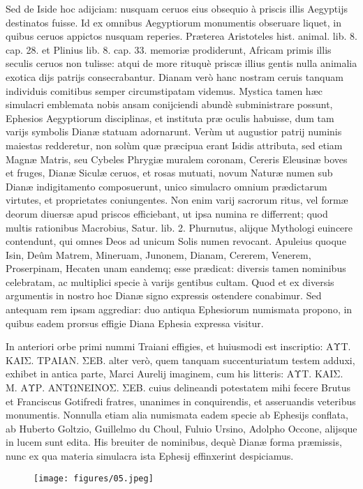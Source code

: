\documentclass[a4paper, 11pt, oneside, polutonikogreek, latin]{article}
\begin{document}
Sed de Iside hoc adijciam: nusquam ceruos eius obsequio à priscis illis Aegyptijs destinatos fuisse. Id ex omnibus Aegyptiorum monumentis obseruare liquet, in quibus ceruos appictos nusquam reperies. Præterea Aristoteles hist. animal. lib. 8. cap. 28. et Plinius lib. 8. cap. 33. memoriæ prodiderunt, Africam primis illis seculis ceruos non tulisse: atqui de more rituquè priscæ illius gentis nulla animalia exotica dijs patrijs consecrabantur. Dianam verò hanc nostram ceruis tanquam individuis comitibus semper circumstipatam videmus. Mystica tamen hæc simulacri emblemata nobis ansam conijciendi abundè subministrare possunt, Ephesios Aegyptiorum disciplinas, et instituta præ oculis habuisse, dum tam varijs symbolis Dianæ statuam adornarunt. Verùm ut augustior patrij numinis maiestas redderetur, non solùm quæ præcipua erant Isidis attributa, sed etiam Magnæ Matris, seu Cybeles Phrygiæ muralem coronam, Cereris Eleusinæ boves et fruges, Dianæ Siculæ ceruos, et rosas mutuati, novum Naturæ numen sub Dianæ indigitamento composuerunt, unico simulacro omnium prædictarum virtutes, et proprietates coniungentes. Non enim varij sacrorum ritus, vel formæ deorum diuersæ apud priscos efficiebant, ut ipsa numina re differrent; quod multis rationibus Macrobius, Satur. lib. 2. Phurnutus, alijque Mythologi euincere contendunt, qui omnes Deos ad unicum Solis numen revocant. Apuleius quoque Isin, Deûm Matrem, Mineruam, Junonem, Dianam, Cererem, Venerem, Proserpinam, Hecaten unam eandemq; esse prædicat: diversis tamen nominibus celebratam, ac multiplici specie à varijs gentibus cultam. Quod et ex diversis argumentis in nostro hoc Dianæ signo expressis ostendere conabimur. Sed antequam rem ipsam aggrediar: duo antiqua Ephesiorum numismata propono, in quibus eadem prorsus effigie Diana Ephesia expressa visitur.

In anteriori orbe primi nummi Traiani effigies, et huiusmodi est inscriptio: \foreignlanguage{greek}{ΑΥΤ. ΚΑΙΣ. ΤΡΑΙΑΝ. ΣΕΒ.} alter verò, quem tanquam succenturiatum testem adduxi, exhibet in antica parte, Marci Aurelij imaginem, cum his litteris: \foreignlanguage{greek}{ΑΥΤ. ΚΑΙΣ. Μ. ΑΥΡ. ΑΝΤΩΝΕΙΝΟΣ. ΣΕΒ.} cuius delineandi potestatem mihi fecere Brutus et Franciscus Gotifredi fratres, unanimes in conquirendis, et asseruandis veteribus monumentis. Nonnulla etiam alia numismata eadem specie ab Ephesijs conflata, ab Huberto Goltzio, Guillelmo du Choul, Fuluio Ursino, Adolpho Occone, alijsque in lucem sunt edita. His breuiter de nominibus, dequè Dianæ forma præmissis, nunc ex qua materia simulacra ista Ephesij effinxerint despiciamus.
\clearpage
\vspace*{\fill}
\begin{figure}[H]
\centering
\texttt{[image: figures/05.jpeg]}
\end{figure}
\vspace*{\fill}
\clearpage
\end{document}
